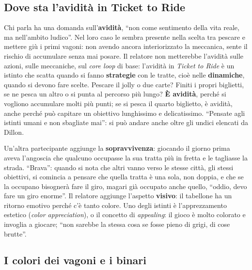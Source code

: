 \subsection{Dove sta l'avidità in Ticket to Ride}

Chi parla ha una domanda sull'\textbf{avidità}, ``non come sentimento della
vita reale, ma nell'ambito ludico''. Nel loro caso le sembra presente nella
scelta tra pescare e mettere giù i primi vagoni: non avendo ancora interiorizzato
la meccanica, sente il rischio di accumulare senza mai posare. Il relatore non
metterebbe l'avidità sulle azioni, sulle meccaniche, sul \emph{core loop} di
base: l'avidità in \emph{Ticket to Ride} è un istinto che scatta quando si fanno
\textbf{strategie} con le tratte, cioè nelle \textbf{dinamiche}, quando si devono
fare scelte. Pescare il jolly o due carte? Finiti i propri biglietti, se ne pesca
un altro o si punta al percorso più lungo? \textbf{È avidità}, perché si vogliono
accumulare molti più punti; se si pesca il quarto biglietto, è avidità, anche
perché può capitare un obiettivo lunghissimo e delicatissimo. ``Pensate agli
istinti umani e non sbagliate mai'': si può andare anche oltre gli undici
elencati da Dillon.

Un'altra partecipante aggiunge la \textbf{sopravvivenza}: giocando il giorno prima
aveva l'angoscia che qualcuno occupasse la sua tratta più in fretta e le tagliasse
la strada. ``Brava'': quando si nota che altri vanno verso le stesse città, gli
stessi obiettivi, si comincia a pensare che quella tratta è una sola, non doppia,
e che se la occupano bisognerà fare il giro, magari già occupato anche quello,
``oddio, devo fare un giro enorme''. Il relatore aggiunge l'aspetto
\textbf{visivo}: il tabellone ha un ritorno emotivo perché c'è tanto colore. Uno
degli istinti è l'apprezzamento estetico (\emph{color appreciation}), o il
concetto di \emph{appealing}: il gioco è molto colorato e invoglia a giocare;
``non sarebbe la stessa cosa se fosse pieno di grigi, di cose brutte''.

\subsection{I colori dei vagoni e i binari}

